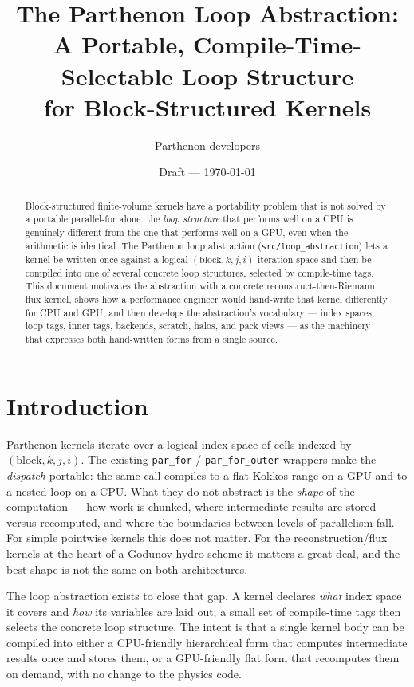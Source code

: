 \documentclass[11pt]{article}
\title{\bf The Parthenon Loop Abstraction:\\
A Portable, Compile-Time-Selectable Loop Structure\\
for Block-Structured Kernels}
\author{Parthenon developers}
\date{Draft --- \today}
\newcommand{\code}[1]{\lstinline[basicstyle=\ttfamily]|#1|}
\begin{document}
\maketitle

\begin{abstract}
Block-structured finite-volume kernels have a portability problem that is not
solved by a portable parallel-for alone: the \emph{loop structure} that performs
well on a CPU is genuinely different from the one that performs well on a GPU,
even when the arithmetic is identical. The Parthenon loop abstraction
(\code{src/loop_abstraction}) lets a kernel be written once against a logical
$(\text{block}, k, j, i)$ iteration space and then be compiled into one of
several concrete loop structures, selected by compile-time tags. This document
motivates the abstraction with a concrete reconstruct-then-Riemann flux kernel,
shows how a performance engineer would hand-write that kernel differently for CPU
and GPU, and then develops the abstraction's vocabulary --- index spaces, loop
tags, inner tags, backends, scratch, halos, and pack views --- as the machinery
that expresses both hand-written forms from a single source.
\end{abstract}

\tableofcontents

\section{Introduction}

Parthenon kernels iterate over a logical index space of cells indexed by
$(\text{block}, k, j, i)$. The existing \code{par_for} / \code{par_for_outer}
wrappers make the \emph{dispatch} portable: the same call compiles to a flat
Kokkos range on a GPU and to a nested loop on a CPU. What they do not abstract is
the \emph{shape} of the computation --- how work is chunked, where intermediate
results are stored versus recomputed, and where the boundaries between levels of
parallelism fall. For simple pointwise kernels this does not matter. For the
reconstruction/flux kernels at the heart of a Godunov hydro scheme it matters a
great deal, and the best shape is not the same on both architectures.

The loop abstraction exists to close that gap. A kernel declares \emph{what}
index space it covers and \emph{how} its variables are laid out; a small set of
compile-time tags then selects the concrete loop structure. The intent is that a
single kernel body can be compiled into either a CPU-friendly hierarchical form
that computes intermediate results once and stores them, or a GPU-friendly flat
form that recomputes them on demand, with no change to the physics code.
\end{document}
